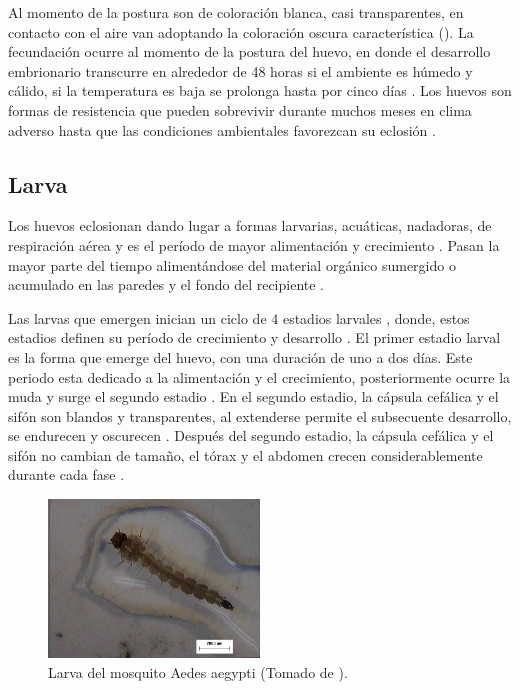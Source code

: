 Al momento de la postura son de coloración blanca, casi transparentes, en contacto con el aire van
adoptando la coloración oscura característica \cite{directricesDetvArg} ().
La fecundación ocurre al momento de la postura del huevo, en donde el desarrollo embrionario
transcurre en alrededor de 48 horas si el ambiente es húmedo y cálido, si la temperatura es baja
se prolonga hasta por cinco días \cite{ThironIzcazaJ2003}. Los huevos son formas de resistencia que
pueden sobrevivir durante muchos meses en clima adverso hasta que las condiciones ambientales
favorezcan su eclosión \cite{directricesDetvArg}.

\subsection{Larva}
\label{subsec:ciclo-biologico-larva}
Los huevos eclosionan dando lugar a formas larvarias, acuáticas, nadadoras, de respiración aérea
\cite{directricesDetvArg} y es el período de mayor alimentación y crecimiento
\cite{web-site:gMonteroBiologia}. Pasan la mayor parte del tiempo alimentándose del material
orgánico sumergido o acumulado en las paredes y el fondo del recipiente
\cite{web-site:gMonteroBiologia, directricesDetvArg}.

Las larvas que emergen inician un ciclo de 4 estadios larvales \cite{web-site:gMonteroBiologia},
donde, estos estadios definen su período de crecimiento y desarrollo \cite{ThironIzcazaJ2003}. El
primer estadio larval es la forma que emerge del huevo, con una duración de uno a dos días. Este
periodo esta dedicado a la alimentación y el crecimiento, posteriormente ocurre la muda y surge el
segundo estadio \cite{ThironIzcazaJ2003}. En el segundo estadio, la cápsula cefálica y el sifón
son blandos y transparentes, al extenderse permite el subsecuente desarrollo, se endurecen y
oscurecen \cite{ThironIzcazaJ2003}. Después del segundo estadio, la cápsula cefálica y el sifón no
cambian de tamaño, el tórax y el abdomen crecen considerablemente durante cada fase
\cite{ThironIzcazaJ2003}.

\begin{figure}[!htbp]
\centering
\includegraphics[width=0.5\textwidth]{capitulo-3/graphics/larva.png}
\caption{\label{fig:cap3-larvas} Larva del mosquito Aedes aegypti (Tomado de
\cite{sivanathan2006ecology}).}
\end{figure}

